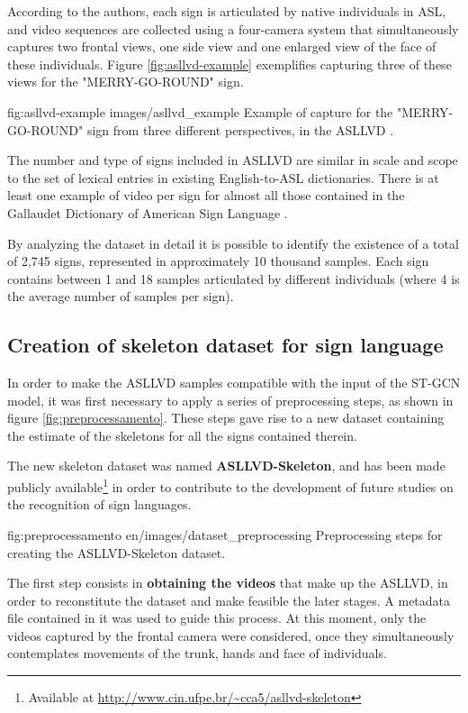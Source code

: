 According to the authors, each sign is articulated by native individuals in ASL, and video sequences are collected using a four-camera system that simultaneously captures two frontal views, one side view and one enlarged view of the face of these individuals. Figure \ref{fig:asllvd-example} exemplifies capturing three of these views for the "MERRY-GO-ROUND" sign. 

\image
    {fig:asllvd-example}
    {images/asllvd_example}
    {Example of capture for the "MERRY-GO-ROUND" sign from three different perspectives, in the ASLLVD \cite[p. 2]{athitsos-asllvd-2008}.}
    
The number and type of signs included in ASLLVD are similar in scale and scope to the set of lexical entries in existing English-to-ASL dictionaries. There is at least one example of video per sign for almost all those contained in the Gallaudet Dictionary of American Sign Language \cite{athitsos-asllvd-2008, gallaudet-2005}.

By analyzing the dataset in detail it is possible to identify the existence of a total of 2,745 signs, represented in approximately 10 thousand samples. Each sign contains between 1 and 18 samples articulated by different individuals (where 4 is the average number of samples per sign).


\subsection{Creation of skeleton dataset for sign language} 
\label{sec:criacao-dataset}

In order to make the ASLLVD samples compatible with the input of the ST-GCN model, it was first necessary to apply a series of preprocessing steps, as shown in figure \ref{fig:preprocessamento}. These steps gave rise to a new dataset containing the estimate of the skeletons for all the signs contained therein.

The new skeleton dataset was named \textbf{ASLLVD-Skeleton}, and has been made publicly available\footnote{
   Available at \url{http://www.cin.ufpe.br/~cca5/asllvd-skeleton}
} in order to contribute to the development of future studies on the recognition of sign languages.

\image
    {fig:preprocessamento}
    {en/images/dataset_preprocessing}
    {Preprocessing steps for creating the ASLLVD-Skeleton dataset.}

The first step consists in \textbf{obtaining the videos} that make up the ASLLVD, in order to reconstitute the dataset and make feasible the later stages. A metadata file contained in it was used to guide this process. At this moment, only the videos captured by the frontal camera were considered, once they simultaneously contemplates movements of the trunk, hands and face of individuals.

